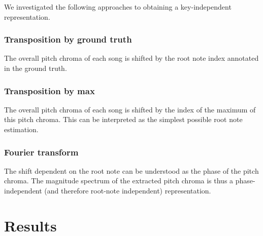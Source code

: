 \documentclass{article}
\begin{document}
We investigated the following approaches to obtaining a key-independent representation.

\subsubsection{Transposition by ground truth}
The overall pitch chroma of each song is shifted by the root note index annotated in the ground truth.

\subsubsection{Transposition by max}
The overall pitch chroma of each song is shifted by the index of the maximum of this pitch chroma. This can be interpreted as the simplest possible root note estimation.

\subsubsection{Fourier transform}
The shift dependent on the root note can be understood as the phase of the pitch chroma. The magnitude spectrum of the extracted pitch chroma is thus a phase-independent (and therefore root-note independent) representation.

\section{Results}
\end{document}

